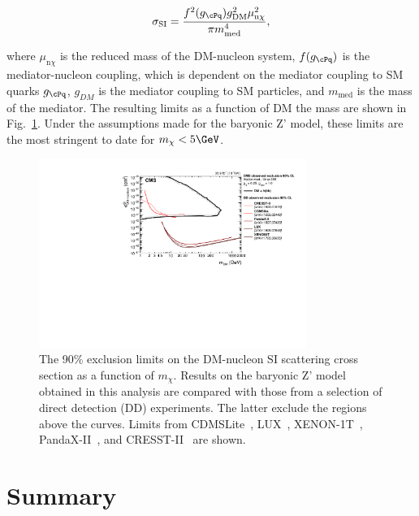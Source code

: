 \begin{equation}
\sigma_\text{SI} = \frac{f^2(g_{\cPq})g^2_{\mathrm{DM}}\mu^2_{\mathrm{n}\chi}}{\pi m^4_{\mathrm{med}}},
\end{equation}

where $\mu_{\mathrm{n}\chi}$ is the reduced mass of the DM-nucleon system, $f(g_{\cPq})$ is the mediator-nucleon coupling, which is dependent on the mediator coupling to SM quarks $g_{\cPq}$, $g_{DM}$ is the mediator coupling to SM particles, and $m_{\text{med}}$ is the mass of the mediator.
The resulting \SigSI limits as a function of DM the mass are shown in Fig.~\ref{fig:limitsdd}.
Under the assumptions made for the baryonic Z' model, these limits are the most stringent to date for $m_\chi < 5\GeV$.


\begin{figure}
  \centering
  \includegraphics[width=0.775\textwidth]{figures/limits/SpinIndepend_XsecDM_MonoHbb_bb_obs_Summary.pdf}
  \caption{The 90\% \CL exclusion limits on the DM-nucleon SI scattering cross section as a function of $m_{\chi}$. 
Results on the baryonic Z' model obtained in this analysis are compared with those from a selection of direct detection (DD) experiments. 
The latter exclude the regions above the curves. 
Limits from CDMSLite~\cite{CDMSLite}, LUX~\cite{LUX}, XENON-1T~\cite{XENON1T}, PandaX-II~\cite{PandaxII}, and CRESST-II~\cite{CresstII} are shown.}
  \label{fig:limitsdd}
\end{figure}


\section{Summary}

